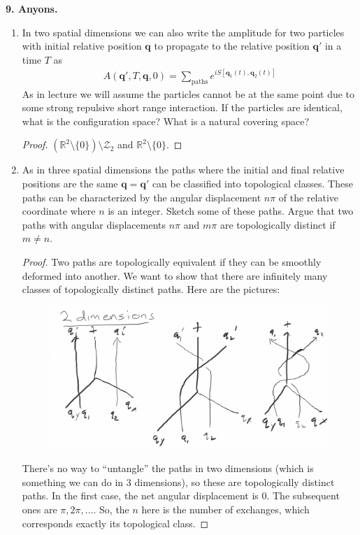 \documentclass{book}
\theoremstyle{definition}
\newcommand{\R}{\mathbb{R}}
\newcommand{\Z}{\mathcal{Z}}
\begin{document}
\noindent \textbf{9. Anyons.} 
$\,$
\begin{enumerate}
	\item In two spatial dimensions we can also write the amplitude for two particles with
	initial relative position $\bm{q}$ to propagate to the relative position $\bm{q}'$ in a time $T$ as 
	\begin{align}
	A(\bm{q}',T,\bm{q},0) = \sum_{\text{paths}} e^{iS[\bm{q}_1(t), \bm{q}_2(t)]}
	\end{align}
	As in lecture we will assume the particles cannot be at the same point due to some
	strong repulsive short range interaction. If the particles are identical, what is the
	configuration space? What is a natural covering space?
	
	
	\begin{proof}
		 $(\R^2\setminus\{0\})\setminus \Z_2$ and $\R^2\setminus \{0\}$. 
	\end{proof}
	
	
	
	\item As in three spatial dimensions the paths where the initial and final relative positions
	are the same $\bm{q} = \bm{q}'$ can be classified into topological classes. These paths can be
	characterized by the angular displacement $n \pi$ of the relative coordinate where $n$ is an integer. Sketch some of these paths. Argue that two paths with angular displacements $n\pi$ and $m\pi$ are topologically distinct if $m\neq n$.
	
	\begin{proof}
		Two paths are topologically equivalent if they can be smoothly deformed into another. We want to show that there are infinitely many classes of topologically distinct paths. Here are the pictures:
		\begin{figure}[!htb]
			\centering
			\includegraphics[scale=0.25]{paths3}
		\end{figure}
	There's no way to ``untangle'' the paths in two dimensions (which is something we can do in 3 dimensions), so these are topologically distinct paths. In the first case, the net angular displacement is 0. The subsequent ones are $\pi, 2\pi, \dots$. So, the $n$ here is the number of exchanges, which corresponds exactly its topological class.
	\end{proof}
	 

\end{enumerate}
\end{document}
